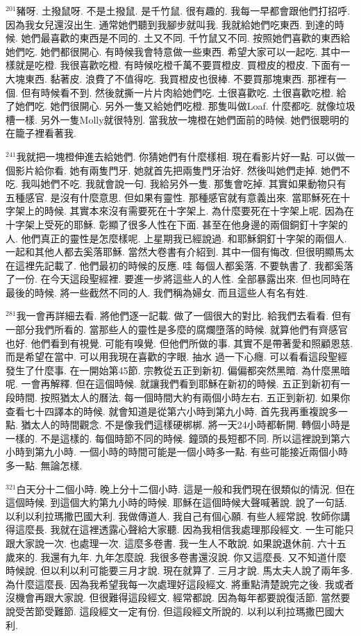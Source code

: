 \documentclass{book}
\begin{document}
$^{201}$豬呀.
土撥鼠呀.
不是土撥鼠.
是千竹鼠.
很有趣的.
我每一早都會跟他們打招呼.
因為我女兒還沒出生.
通常她們聽到我腳步就叫我.
我就給她們吃東西.
到達的時候.
她們最喜歡的東西是不同的.
土又不同.
千竹鼠又不同.
按照她們喜歡的東西給她們吃.
她們都很開心.
有時候我會特意做一些東西.
希望大家可以一起吃.
其中一樣就是吃橙.
我很喜歡吃橙.
有時候吃橙千萬不要買橙皮.
買橙皮的橙皮.
下面有一大塊東西.
黏著皮.
浪費了不值得吃.
我買橙皮也很棒.
不要買那塊東西.
那裡有一個.
但有時候看不到.
然後就撕一片片肉給她們吃.
土很喜歡吃.
土很喜歡吃橙.
給了她們吃.
她們很開心.
另外一隻又給她們吃橙.
那隻叫做Loaf.
什麼都吃.
就像垃圾槽一樣.
另外一隻Molly就很特別.
當我放一塊橙在她們面前的時候.
她們很聰明的在籠子裡看著我.

$^{241}$我就把一塊橙伸進去給她們.
你猜她們有什麼樣相.
現在看影片好一點.
可以做一個影片給你看.
她有兩隻門牙.
她就首先把兩隻門牙治好.
然後叫她們走掉.
她們不吃.
我叫她們不吃.
我就會說一句.
我給另外一隻.
那隻會吃掉.
其實如果動物只有五種感官.
是沒有什麼意思.
但如果有靈性.
那種感官就有意義出來.
當耶穌死在十字架上的時候.
其實本來沒有需要死在十字架上.
為什麼要死在十字架上呢.
因為在十字架上受死的耶穌.
彰顯了很多人性在下面.
甚至在他身邊的兩個銅釘十字架的人.
他們真正的靈性是怎麼樣呢.
上星期我已經說過.
和耶穌銅釘十字架的兩個人.
一起和其他人都去奚落耶穌.
當然大卷書有介紹到.
其中一個有悔改.
但很明顯馬太在這裡先記載了.
他們最初的時候的反應.
哇 每個人都奚落.
不要執書了.
我都奚落了一份.
在今天這段聖經裡.
要進一步將這些人的人性.
全部暴露出來.
但也同時在最後的時候.
將一些截然不同的人.
我們稱為婦女.
而且這些人有名有姓.

$^{281}$我一會再詳細去看.
將他們逐一記載.
做了一個很大的對比.
給我們去看看.
但有一部分我們所看的.
當那些人的靈性是多麼的腐爛墮落的時候.
就算他們有齊感官也好.
他們看到有視覺.
可能有嗅覺.
但他們所做的事.
其實不是帶著愛和照顧恩慈.
而是希望在當中.
可以用我現在喜歡的字眼.
抽水 過一下心癮.
可以看看這段聖經發生了什麼事.
在一開始第45節.
宗教從五正到新初.
偏偏都突然黑暗.
為什麼黑暗呢.
一會再解釋.
但在這個時候.
就讓我們看到耶穌在新初的時候.
五正到新初有一段時間.
按照猶太人的曆法.
每一個時間大約有兩個小時左右.
五正到新初.
如果你查看七十四譯本的時候.
就會知道是從第六小時到第九小時.
首先我再重複說多一點.
猶太人的時間觀念.
不是像我們這樣硬梆梆.
將一天24小時都斬開.
轉個小時是一樣的.
不是這樣的.
每個時節不同的時候.
鐘頭的長短都不同.
所以這裡說到第六小時到第九小時.
一個小時的時間可能是一個小時多一點.
有些可能接近兩個小時多一點.
無論怎樣.

$^{321}$白天分十二個小時.
晚上分十二個小時.
這是一般和我們現在很類似的情況.
但在這個時候.
到這個大約第九小時的時候.
耶穌在這個時候大聲喊著說.
說了一句話.
以利以利拉瑪撒巴國大利.
我做傳道人.
我自己有個心願.
有些人經常說.
牧師你講得這麼長.
我就在這裡透露心聲給大家聽.
因為我相信我處理那段經文.
一生可能只跟大家說一次.
也處理一次.
這麼多卷書.
我一生人不敢說.
如果說退休前.
六十五歲來的.
我還有九年.
九年怎麼說.
我很多卷書還沒說.
你又這麼長.
又不知道什麼時候說.
但以利以利可能要三月才說.
現在就算了.
三月才說.
馬太夫人說了兩年多.
為什麼這麼長.
因為我希望我每一次處理好這段經文.
將重點清楚說完之後.
我或者沒機會再跟大家說.
但很難得這段經文.
經常都說.
因為每年都要說復活節.
當然要說受苦節受難節.
這段經文一定有份.
但這段經文所說的.
以利以利拉瑪撒巴國大利.
\end{document}
